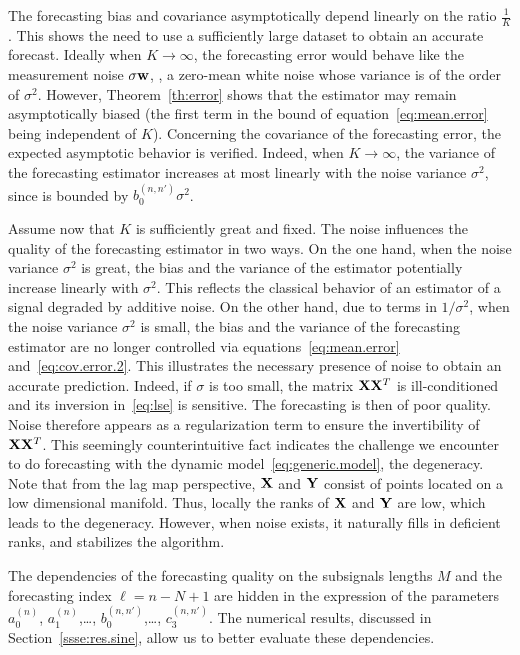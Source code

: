 The forecasting bias and covariance asymptotically depend linearly on the ratio $\frac{1}{K}$. This shows the need to use a sufficiently large dataset to obtain an accurate forecast. Ideally when $K\to\infty$, the forecasting error would behave like the measurement noise $\sigma{\mathbf w}$, \ie, a zero-mean white noise whose variance is of the order of $\sigma^2$. However, Theorem~\ref{th:error} shows that the estimator may remain asymptotically biased (the first term in the bound of equation~\eqref{eq:mean.error} being independent of $K$). Concerning the covariance of the forecasting error, the expected asymptotic behavior is verified. Indeed, when $K \to\infty$, the variance of the forecasting estimator increases at most linearly with the noise variance $\sigma^2$, since is bounded by $b_0^{(n,n')}\sigma^2$.

Assume now that $K$ is sufficiently great and fixed. The noise influences the quality of the forecasting estimator in two ways. On the one hand, when the noise variance $\sigma^2$ is great, the bias and the variance of the estimator potentially increase linearly with $\sigma^2$. This reflects the classical behavior of an estimator of a signal degraded by additive noise. On the other hand, due to terms in $1/\sigma^2$, when the noise variance $\sigma^2$ is small, the bias and the variance of the forecasting estimator are no longer controlled via equations~\eqref{eq:mean.error} and~\eqref{eq:cov.error.2}. This illustrates the necessary presence of noise to obtain an accurate prediction. Indeed, if $\sigma$ is too small, the matrix ${\mathbf X}{\mathbf X}^T$ is ill-conditioned and its inversion in~\eqref{eq:lse} is sensitive. The forecasting is then of poor quality. Noise therefore appears as a regularization term to ensure the invertibility of ${\mathbf X}{\mathbf X}^T$. This seemingly counterintuitive fact indicates the challenge we encounter to do forecasting with the dynamic model~\eqref{eq:generic.model}, the degeneracy. Note that from the lag map perspective, ${\mathbf X}$ and ${\mathbf Y}$ consist of points located on a low dimensional manifold. Thus, locally the ranks of ${\mathbf X}$ and ${\mathbf Y}$ are low, which leads to the degeneracy. However, when noise exists, it naturally fills in deficient ranks, and stabilizes the algorithm. 


The dependencies of the forecasting quality on the subsignals lengths $M$ and the forecasting index $\ell=n-N+1$ are hidden in the expression of the parameters $a^{(n)}_0$, $a^{(n)}_1$,\dots, $b^{(n,n')}_0$,\dots, $c^{(n,n')}_3$. The numerical results, discussed in Section~\ref{ssse:res.sine}, allow us to better evaluate these dependencies.

